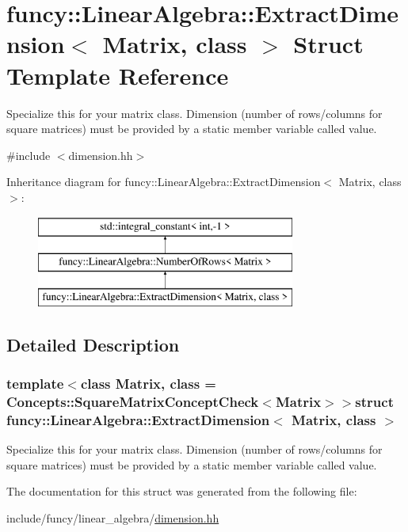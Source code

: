 \hypertarget{structfuncy_1_1LinearAlgebra_1_1ExtractDimension}{\section{funcy\-:\-:Linear\-Algebra\-:\-:Extract\-Dimension$<$ Matrix, class $>$ Struct Template Reference}
\label{structfuncy_1_1LinearAlgebra_1_1ExtractDimension}
}


Specialize this for your matrix class. Dimension (number of rows/columns for square matrices) must be provided by a static member variable called value.  




{\ttfamily \#include $<$dimension.\-hh$>$}

Inheritance diagram for funcy\-:\-:Linear\-Algebra\-:\-:Extract\-Dimension$<$ Matrix, class $>$\-:\begin{figure}[H]
\begin{center}
\leavevmode
\includegraphics[height=3.000000cm]{structfuncy_1_1LinearAlgebra_1_1ExtractDimension}
\end{center}
\end{figure}


\subsection{Detailed Description}
\subsubsection*{template$<$class Matrix, class = Concepts\-::\-Square\-Matrix\-Concept\-Check$<$\-Matrix$>$$>$struct funcy\-::\-Linear\-Algebra\-::\-Extract\-Dimension$<$ Matrix, class $>$}

Specialize this for your matrix class. Dimension (number of rows/columns for square matrices) must be provided by a static member variable called value. 

The documentation for this struct was generated from the following file\-:\begin{DoxyCompactItemize}
\item 
include/funcy/linear\-\_\-algebra/\hyperlink{dimension_8hh}{dimension.\-hh}\end{DoxyCompactItemize}
